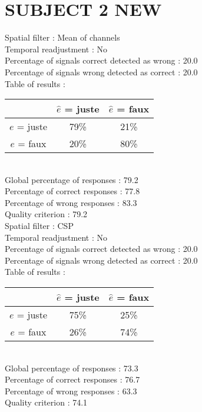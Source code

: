 \section*{SUBJECT 2 NEW}
Spatial filter : Mean of channels \\
Temporal readjustment : No \\
Percentage of signals correct detected as wrong :   20.0 \\
Percentage of signals wrong detected as correct :   20.0 \\
Table of results : \\
\begin{tabular}{|c|c|c|}
\hline				& $\hat{e}$ = juste & $\hat{e}$ = faux \\
\hline  $e$ = juste	&     79\%			&     21\%		\\
\hline  $e$ = faux	&     20\%			&     80\%		\\
\hline
\end{tabular}\\
Global percentage of responses :   79.2 \\
Percentage of correct responses :   77.8 \\
Percentage of wrong responses :   83.3 \\
Quality criterion :   79.2 \\

Spatial filter : CSP \\
Temporal readjustment : No \\
Percentage of signals correct detected as wrong :   20.0 \\
Percentage of signals wrong detected as correct :   20.0 \\
Table of results : \\
\begin{tabular}{|c|c|c|}
\hline				& $\hat{e}$ = juste & $\hat{e}$ = faux \\
\hline  $e$ = juste	&     75\%			&     25\%		\\
\hline  $e$ = faux	&     26\%			&     74\%		\\
\hline
\end{tabular}\\
Global percentage of responses :   73.3 \\
Percentage of correct responses :   76.7 \\
Percentage of wrong responses :   63.3 \\
Quality criterion :   74.1 \\

